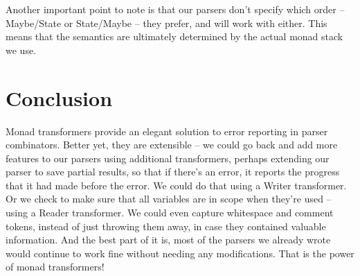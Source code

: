 \documentclass{tmr}
\begin{document}
Another important point to note is that our parsers don't specify
which order -- Maybe/State or State/Maybe -- they prefer, and will 
work with either.  This means that the semantics are ultimately determined by 
the actual monad stack we use.




\section{Conclusion}
Monad transformers provide an elegant solution to error reporting in parser
combinators.  Better yet, they are extensible -- we could go back and add more
features to our parsers using additional transformers, perhaps extending our
parser to save partial results, so that if there's an error, it reports the
progress that it had made before the error.  We could do that using a Writer
transformer.  Or we check to make sure that all variables are in scope when
they're used -- using a Reader transformer.  We could even capture whitespace
and comment tokens, instead of just throwing them away, in case they contained
valuable information.  And the best part of it is, most of the parsers we already
wrote would continue to work fine without needing any modifications.  That
is the power of monad transformers!





\end{document}
